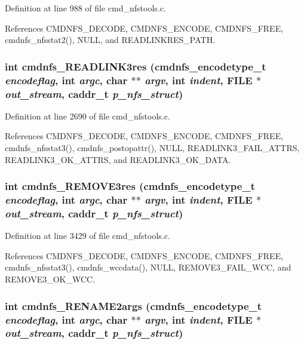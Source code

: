 Definition at line 988 of file cmd\_\-nfstools.c.

References CMDNFS\_\-DECODE, CMDNFS\_\-ENCODE, CMDNFS\_\-FREE, cmdnfs\_\-nfsstat2(), NULL, and READLINKRES\_\-PATH.
\subsubsection{\setlength{\rightskip}{0pt plus 5cm}int cmdnfs\_\-READLINK3res ({\bf cmdnfs\_\-encodetype\_\-t} {\em encodeflag}, int {\em argc}, char $\ast$$\ast$ {\em argv}, int {\em indent}, FILE $\ast$ {\em out\_\-stream}, caddr\_\-t {\em p\_\-nfs\_\-struct})}\label{cmd__nfstools_8h_a46}




Definition at line 2690 of file cmd\_\-nfstools.c.

References CMDNFS\_\-DECODE, CMDNFS\_\-ENCODE, CMDNFS\_\-FREE, cmdnfs\_\-nfsstat3(), cmdnfs\_\-postopattr(), NULL, READLINK3\_\-FAIL\_\-ATTRS, READLINK3\_\-OK\_\-ATTRS, and READLINK3\_\-OK\_\-DATA.
\subsubsection{\setlength{\rightskip}{0pt plus 5cm}int cmdnfs\_\-REMOVE3res ({\bf cmdnfs\_\-encodetype\_\-t} {\em encodeflag}, int {\em argc}, char $\ast$$\ast$ {\em argv}, int {\em indent}, FILE $\ast$ {\em out\_\-stream}, caddr\_\-t {\em p\_\-nfs\_\-struct})}\label{cmd__nfstools_8h_a54}




Definition at line 3429 of file cmd\_\-nfstools.c.

References CMDNFS\_\-DECODE, CMDNFS\_\-ENCODE, CMDNFS\_\-FREE, cmdnfs\_\-nfsstat3(), cmdnfs\_\-wccdata(), NULL, REMOVE3\_\-FAIL\_\-WCC, and REMOVE3\_\-OK\_\-WCC.
\subsubsection{\setlength{\rightskip}{0pt plus 5cm}int cmdnfs\_\-RENAME2args ({\bf cmdnfs\_\-encodetype\_\-t} {\em encodeflag}, int {\em argc}, char $\ast$$\ast$ {\em argv}, int {\em indent}, FILE $\ast$ {\em out\_\-stream}, caddr\_\-t {\em p\_\-nfs\_\-struct})}\label{cmd__nfstools_8h_a66}




